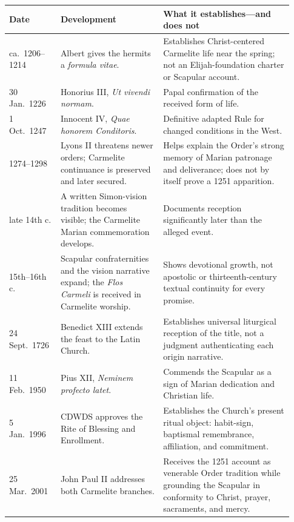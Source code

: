 \begin{center}
\footnotesize
\begin{longtable}{@{}p{0.16\linewidth}p{0.34\linewidth}p{0.43\linewidth}@{}}
\toprule
\textbf{Date} & \textbf{Development} & \textbf{What it establishes---and does not}\\
\midrule
\endhead
ca.~1206--1214 & Albert gives the hermits a \textit{formula vitae}. & Establishes Christ-centered Carmelite life near the spring; not an Elijah-foundation charter or Scapular account.\\
30 Jan.~1226 & Honorius III, \textit{Ut vivendi normam}. & Papal confirmation of the received form of life.\\
1 Oct.~1247 & Innocent IV, \textit{Quae honorem Conditoris}. & Definitive adapted Rule for changed conditions in the West.\\
1274--1298 & Lyons II threatens newer orders; Carmelite continuance is preserved and later secured. & Helps explain the Order's strong memory of Marian patronage and deliverance; does not by itself prove a 1251 apparition.\\
late 14th c. & A written Simon-vision tradition becomes visible; the Carmelite Marian commemoration develops. & Documents reception significantly later than the alleged event.\\
15th--16th c. & Scapular confraternities and the vision narrative expand; the \textit{Flos Carmeli} is received in Carmelite worship. & Shows devotional growth, not apostolic or thirteenth-century textual continuity for every promise.\\
24 Sept.~1726 & Benedict XIII extends the feast to the Latin Church. & Establishes universal liturgical reception of the title, not a judgment authenticating each origin narrative.\\
11 Feb.~1950 & Pius XII, \textit{Neminem profecto latet}. & Commends the Scapular as a sign of Marian dedication and Christian life.\\
5 Jan.~1996 & CDWDS approves the Rite of Blessing and Enrollment. & Establishes the Church's present ritual object: habit-sign, baptismal remembrance, affiliation, and commitment.\\
25 Mar.~2001 & John Paul II addresses both Carmelite branches. & Receives the 1251 account as venerable Order tradition while grounding the Scapular in conformity to Christ, prayer, sacraments, and mercy.\\
\bottomrule
\end{longtable}
\end{center}


